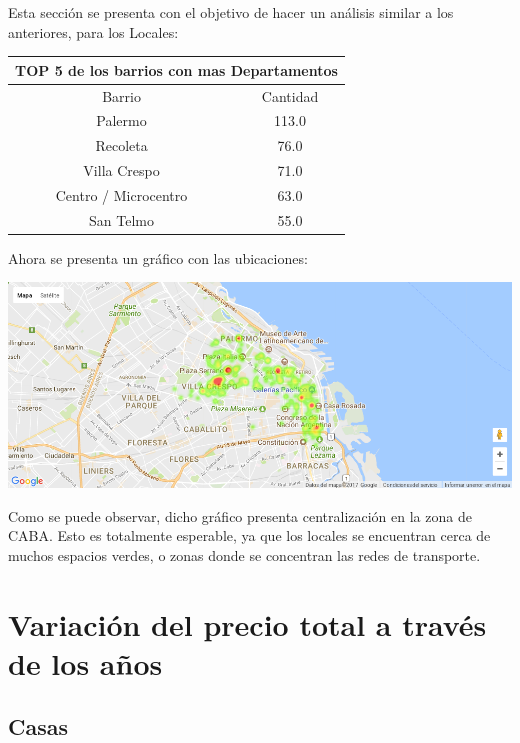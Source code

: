\documentclass[a4paper, 10pt]{article}
\begin{document}
				Esta sección se presenta con el objetivo de hacer un análisis similar a los anteriores, para los Locales:
				
				\begin{center}
						\begin{tabular}{ |c|c| }
							\hline
							\multicolumn{2}{|c|}{TOP 5 de los barrios con mas Departamentos}\\
							\hline
							\hline
							Barrio & Cantidad\\
							\hline
							Palermo & 113.0 \\
							Recoleta & 76.0 \\
							Villa Crespo & 71.0 \\
							Centro / Microcentro & 63.0 \\
							San Telmo &	55.0 \\
							\hline
						\end{tabular}
					\end{center}
				
				Ahora se presenta un gráfico con las ubicaciones:
				
				\begin{center}
   		    				\includegraphics[width=\textwidth]{images/ubicMLocales}
				\end{center}
				
				Como se puede observar, dicho gráfico presenta centralización en la zona de CABA.
				Esto es totalmente esperable, ya que los locales se encuentran cerca de muchos espacios verdes, o zonas donde se concentran las redes de transporte.
		
		\section{Variación del precio total a través de los años}
			\subsection{Casas}
\end{document}
